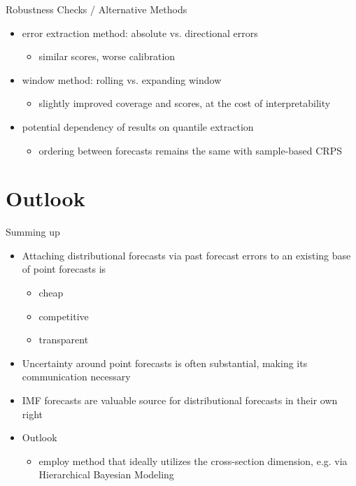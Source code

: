 \documentclass[en]{sdqbeamer}
\begin{document}
\begin{frame}{Robustness Checks / Alternative Methods}
\begin{itemize}
    \item error extraction method: absolute vs. directional errors
    \begin{itemize}
    \item similar scores, worse calibration \hyperlink{errorextraction}{}
    \end{itemize}
    \item window method: rolling vs. expanding window
    \begin{itemize}
    \item slightly improved coverage and scores, at the cost of interpretability \hyperlink{extractionmethod}{}
    \end{itemize}
    \item potential dependency of results on quantile extraction \\
    \begin{itemize}
        \item ordering between forecasts remains the same with sample-based CRPS \hyperlink{samplecrps}{}
    \end{itemize}
\end{itemize}
\end{frame}



\section{Outlook}

\begin{frame}{Summing up}
\begin{itemize}
\item Attaching distributional forecasts via past forecast errors to an existing base of point forecasts is
    \begin{itemize}
        \item cheap
        \item competitive
        \item transparent
    \end{itemize}
\item Uncertainty around point forecasts is often substantial, making its communication necessary
\item IMF forecasts are valuable source for distributional forecasts in their own right \bigskip \\
\item     Outlook
    \begin{itemize}
        \item employ method that ideally utilizes the cross-section dimension, e.g. via Hierarchical Bayesian Modeling
    \end{itemize}

\end{itemize}
\end{frame}
\end{document}
